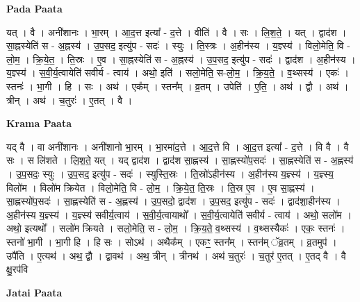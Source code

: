 \documentclass[17pt]{extarticle}
\begin{document}
\textbf{Pada Paata} \newline

यत् । वै । अनी॑शानः । भा॒रम् । आ॒द॒त्त इत्या᳚ - द॒त्ते । वीति॑ । वै । सः । लि॒श॒ते॒ । यत् । द्वाद॑श । सा॒ह्नस्येति॑ स - अ॒ह्नस्य॑ । उ॒प॒सद॒ इत्यु॑प - सदः॑ । स्युः । ति॒स्त्रः । अ॒हीन॑स्य । य॒ज्ञ्स्य॑ । विलो॒मेति॒ वि - लो॒म॒ । क्रि॒ये॒त॒ । ति॒स्रः । ए॒व । सा॒ह्नस्येति॑ स - अ॒ह्नस्य॑ । उ॒प॒सद॒ इत्यु॑प - सदः॑ । द्वाद॑श । अ॒हीन॑स्य । य॒ज्ञ्स्य॑ । स॒वी॒र्य॒त्वायेति॑ सवीर्य - त्वाय॑ । अथो॒ इति॑ । सलो॒मेति॒ स-लो॒म॒ । क्रि॒य॒ते॒ । व॒थ्सस्य॑ । एकः॑ । स्तनः॑ । भा॒गी । हि । सः । अथ॑ । एक᳚म् । स्तन᳚म् । व्र॒तम् । उपेति॑ । ए॒ति॒ । अथ॑ । द्वौ । अथ॑ । त्रीन् । अथ॑ । च॒तुरः॑ । ए॒तत् । वै ।  \newline


\textbf{Krama Paata} \newline

यद् वै । वा अनी॑शानः । अनी॑शानो भा॒रम् । भा॒रमा॑द॒त्ते । आ॒द॒त्ते वि । आ॒द॒त्त इत्या᳚ - द॒त्ते । वि वै । वै सः । स लि॑शते । लि॒श॒ते॒ यत् । यद् द्वाद॑श । द्वाद॑श सा॒ह्नस्य॑ । सा॒ह्नस्यो॑प॒सदः॑ । सा॒ह्नस्येति॑ स - अ॒ह्नस्य॑ । उ॒प॒सदः॒ स्युः । उ॒प॒सद॒ इत्यु॑प - सदः॑ । स्युस्ति॒स्रः । ति॒स्रो॑ऽहीन॑स्य । अ॒हीन॑स्य य॒ज्ञ्स्य॑ । य॒ज्ञ्स्य॒ विलो॑म । विलो॑म क्रियेत । विलो॒मेति॒ वि - लो॒म॒ । क्रि॒ये॒त॒ ति॒स्रः । ति॒स्र ए॒व । ए॒व सा॒ह्नस्य॑ । सा॒ह्नस्यो॑प॒सदः॑ । सा॒ह्नस्येति॑ स - अ॒ह्नस्य॑ । उ॒प॒सदो॒ द्वाद॑श । उ॒प॒सद॒ इत्यु॑प - सदः॑ । द्वाद॑शा॒हीन॑स्य । अ॒हीन॑स्य य॒ज्ञ्स्य॑ । य॒ज्ञ्स्य॑ सवीर्य॒त्वाय॑ । स॒वी॒र्य॒त्वायाथो᳚ । स॒वी॒र्य॒त्वायेति॑ सवीर्य - त्वाय॑ । अथो॒ सलो॑म । अथो॒ इत्यथो᳚ । सलो॑म क्रियते । सलो॒मेति॒ स - लो॒म॒ । क्रि॒य॒ते॒ व॒थ्सस्य॑ । व॒थ्सस्यैकः॑ । एकः॒ स्तनः॑ । स्तनो॑ भा॒गी । भा॒गी हि । हि सः । सोऽथ॑ । अथैक᳚म् । एकꣳ॒॒ स्तन᳚म् । स्तन॑म् ॅव्र॒तम् । व्र॒तमुप॑ । उपै॑ति । ए॒त्यथ॑ । अथ॒ द्वौ । द्वावथ॑ । अथ॒ त्रीन् । त्रीनथ॑ । अथ॑ च॒तुरः॑ । च॒तुर॑ ए॒तत् । ए॒तद् वै । वै क्षु॒रप॑वि \newline

\textbf{Jatai Paata} \newline
\end{document}
